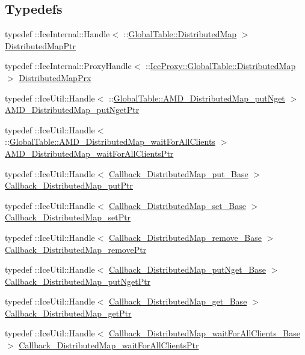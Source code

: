 \subsection*{Typedefs}
\begin{DoxyCompactItemize}
\item 
typedef ::IceInternal::Handle$<$ ::\hyperlink{class_global_table_1_1_distributed_map}{GlobalTable::DistributedMap} $>$ \hyperlink{namespace_global_table_a37c83cf33bd6e59c8b648a60e1309e5b}{DistributedMapPtr}
\item 
typedef ::IceInternal::ProxyHandle$<$ ::\hyperlink{class_ice_proxy_1_1_global_table_1_1_distributed_map}{IceProxy::GlobalTable::DistributedMap} $>$ \hyperlink{namespace_global_table_a54672ca2efff5152d9759b4eb9957676}{DistributedMapPrx}
\item 
typedef ::IceUtil::Handle$<$ ::\hyperlink{class_global_table_1_1_a_m_d___distributed_map__put_nget}{GlobalTable::AMD\_\-DistributedMap\_\-putNget} $>$ \hyperlink{namespace_global_table_a428cb1ad01dcd657dfcfef5d25f3ac5a}{AMD\_\-DistributedMap\_\-putNgetPtr}
\item 
typedef ::IceUtil::Handle$<$ ::\hyperlink{class_global_table_1_1_a_m_d___distributed_map__wait_for_all_clients}{GlobalTable::AMD\_\-DistributedMap\_\-waitForAllClients} $>$ \hyperlink{namespace_global_table_af3e96d293fa3f6f274f78b841b3c3097}{AMD\_\-DistributedMap\_\-waitForAllClientsPtr}
\item 
typedef ::IceUtil::Handle$<$ \hyperlink{class_global_table_1_1_callback___distributed_map__put___base}{Callback\_\-DistributedMap\_\-put\_\-Base} $>$ \hyperlink{namespace_global_table_a652e5fcf9acdfd0d854019d109b9644a}{Callback\_\-DistributedMap\_\-putPtr}
\item 
typedef ::IceUtil::Handle$<$ \hyperlink{class_global_table_1_1_callback___distributed_map__set___base}{Callback\_\-DistributedMap\_\-set\_\-Base} $>$ \hyperlink{namespace_global_table_a8196b91ca3241e16fd9aac727da95e02}{Callback\_\-DistributedMap\_\-setPtr}
\item 
typedef ::IceUtil::Handle$<$ \hyperlink{class_global_table_1_1_callback___distributed_map__remove___base}{Callback\_\-DistributedMap\_\-remove\_\-Base} $>$ \hyperlink{namespace_global_table_a38ad32022b6559c698996becbe357749}{Callback\_\-DistributedMap\_\-removePtr}
\item 
typedef ::IceUtil::Handle$<$ \hyperlink{class_global_table_1_1_callback___distributed_map__put_nget___base}{Callback\_\-DistributedMap\_\-putNget\_\-Base} $>$ \hyperlink{namespace_global_table_afeefcdd5dfb862806549e834b8727011}{Callback\_\-DistributedMap\_\-putNgetPtr}
\item 
typedef ::IceUtil::Handle$<$ \hyperlink{class_global_table_1_1_callback___distributed_map__get___base}{Callback\_\-DistributedMap\_\-get\_\-Base} $>$ \hyperlink{namespace_global_table_a9ad421b8bc43ec4b2173407f2bed7ecc}{Callback\_\-DistributedMap\_\-getPtr}
\item 
typedef ::IceUtil::Handle$<$ \hyperlink{class_global_table_1_1_callback___distributed_map__wait_for_all_clients___base}{Callback\_\-DistributedMap\_\-waitForAllClients\_\-Base} $>$ \hyperlink{namespace_global_table_a110ac4602b8f6c72aa866923747317e3}{Callback\_\-DistributedMap\_\-waitForAllClientsPtr}
\end{DoxyCompactItemize}
